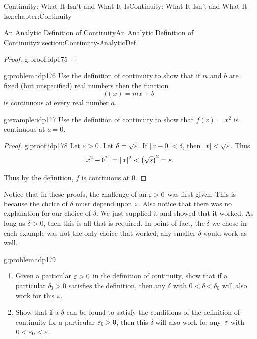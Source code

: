 \begin{chapterptx}{Continuity: What It Isn't and What It Is}{}{Continuity: What It Isn't and What It Is}{}{}{x:chapter:Continuity}
\begin{sectionptx}{An Analytic Definition of Continuity}{}{An Analytic Definition of Continuity}{}{}{x:section:Continuity-AnalyticDef}
\begin{proof}{}{g:proof:idp175}
		\end{proof}
		\begin{problem}{}{g:problem:idp176}%
			 Use the definition of continuity to show that if \(m\) and \(b\) are fixed (but unspecified) real numbers then the function%
			\begin{equation*}
				f(x) = mx+b
			\end{equation*}
			is continuous at every real number \(a\).%
		\end{problem}
		\begin{example}{}{g:example:idp177}%
			Use the definition of continuity to show that \(f(x)=x^2\) is continuous at \(a=0\).%
		\end{example}
		\begin{proof}{}{g:proof:idp178}
			Let \(\varepsilon>0\). Let \(\delta=\sqrt{\varepsilon}\). If \(|\,x-0|\lt \delta\), then \(|\,x|< \sqrt{\varepsilon}\). Thus%
			\begin{equation*}
				\left|x^2-0^2\right|=|\,x|^2< \left(\sqrt{\varepsilon}\right)^2=\varepsilon\text{.}
			\end{equation*}
			\par
			Thus by the definition, \(f\) is continuous at \(0\).%
		\end{proof}
		Notice that in these proofs, the challenge of an \(\varepsilon>0\) was first given.  This is because the choice of \(\delta\) must depend upon \(\varepsilon\).  Also notice that there was no explanation for our choice of \(\delta\).  We just supplied it and showed that it worked.  As long as \(\delta>0\), then this is all that is required.  In point of fact, the \(\delta\) we chose in each example was not the only choice that worked; any smaller \(\delta\) would work as well.%
		\begin{problem}{}{g:problem:idp179}%
			\begin{enumerate}[font=\bfseries,label=(\alph*),ref=\alph*]
				\item{}Given a particular \(\varepsilon>0\) in the definition of continuity, show that if a particular \(\delta_0>0\) satisfies the definition, then any \(\delta\) with \(0\lt \delta\lt \delta_0\) will also work for this \(\varepsilon\).%
				\item{}Show that if a \(\delta\) can be found to satisfy the conditions of the definition of continuity for a particular \(\varepsilon_0>0\), then this \(\delta\) will also work for any \(\,\varepsilon\) with \(0< \varepsilon_0<
				\varepsilon\).%
			\end{enumerate}
		\end{problem}

\end{sectionptx}
\end{chapterptx}
